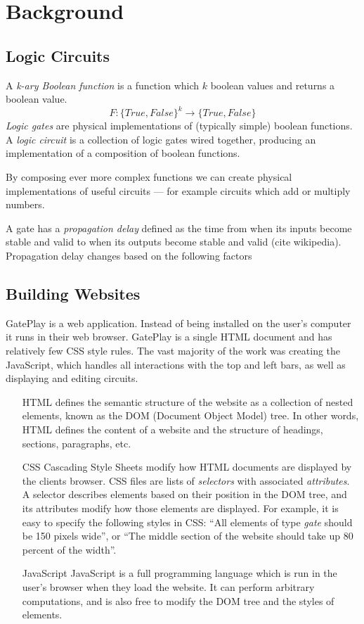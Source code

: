 \chapter{Background}
\label{chapter:background}

\section{Logic Circuits}
\label{sec:circuits}
A \textit{k-ary Boolean function} is a function which $k$ boolean values and returns a boolean value.
\[ F : \{True, False\}^k \rightarrow \{True, False\} \]
\textit{Logic gates} are physical implementations of (typically simple) boolean functions. A \textit{logic circuit} is a collection of logic gates wired together, producing an implementation of a composition of boolean functions.

By composing ever more complex functions we can create physical implementations of useful circuits --- for example circuits which add or multiply numbers.

A gate has a \textit{propagation delay} defined as the time from when its inputs become stable and valid to when its outputs become stable and valid (cite wikipedia). Propagation delay changes based on the following factors

\section{Building Websites}
GatePlay is a web application. Instead of being installed on the user's computer it runs in their web browser. GatePlay is a single HTML document and has relatively few CSS style rules. The vast majority of the work was creating the JavaScript, which handles all interactions with the top and left bars, as well as displaying and editing circuits.

\begin{itemize}
	\item[HTML] defines the semantic structure of the website as a collection of nested elements, known as the DOM (Document Object Model) tree. In other words, HTML defines the content of a website and the structure of headings, sections, paragraphs, etc.
	
	\item[CSS] Cascading Style Sheets modify how HTML documents are displayed by the clients browser. CSS files are lists of \textit{selectors} with associated \textit{attributes}. A selector describes elements based on their position in the DOM tree, and its attributes modify how those elements are displayed. For example, it is easy to specify the following styles in CSS: ``All elements of type \textit{gate} should be 150 pixels wide'', or ``The middle section of the website should take up 80 percent of the width''.
	
	\item[JavaScript] JavaScript is a full programming language which is run in the user's browser when they load the website. It can perform arbitrary computations, and is also free to modify the DOM tree and the styles of elements.
\end{itemize}